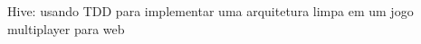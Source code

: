 \documentclass[a4paper,12pt]{article}
\begin{document}
Hive: usando TDD para implementar uma arquitetura limpa em um jogo multiplayer para web


% 
\end{document}
